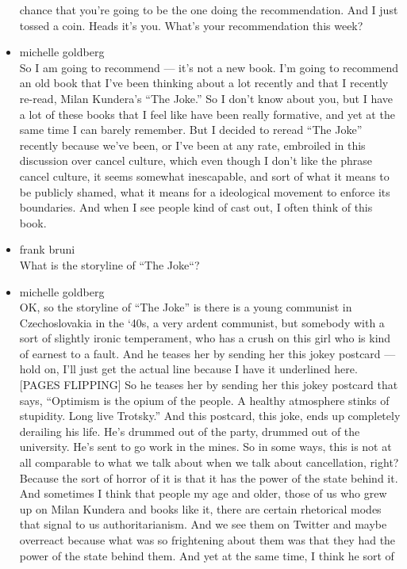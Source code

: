 \begin{itemize}
  chance that you're going to be the one doing the recommendation. And I
  just tossed a coin. Heads it's you. What's your recommendation this
  week?
\item
  michelle goldberg\\
  So I am going to recommend --- it's not a new book. I'm going to
  recommend an old book that I've been thinking about a lot recently and
  that I recently re-read, Milan Kundera's ``The Joke.'' So I don't know
  about you, but I have a lot of these books that I feel like have been
  really formative, and yet at the same time I can barely remember. But
  I decided to reread ``The Joke'' recently because we've been, or I've
  been at any rate, embroiled in this discussion over cancel culture,
  which even though I don't like the phrase cancel culture, it seems
  somewhat inescapable, and sort of what it means to be publicly shamed,
  what it means for a ideological movement to enforce its boundaries.
  And when I see people kind of cast out, I often think of this book.
\item
  frank bruni\\
  What is the storyline of ``The Joke``?
\item
  michelle goldberg\\
  OK, so the storyline of ``The Joke'' is there is a young communist in
  Czechoslovakia in the `40s, a very ardent communist, but somebody with
  a sort of slightly ironic temperament, who has a crush on this girl
  who is kind of earnest to a fault. And he teases her by sending her
  this jokey postcard --- hold on, I'll just get the actual line because
  I have it underlined here. {[}PAGES FLIPPING{]} So he teases her by
  sending her this jokey postcard that says, ``Optimism is the opium of
  the people. A healthy atmosphere stinks of stupidity. Long live
  Trotsky.'' And this postcard, this joke, ends up completely derailing
  his life. He's drummed out of the party, drummed out of the
  university. He's sent to go work in the mines. So in some ways, this
  is not at all comparable to what we talk about when we talk about
  cancellation, right? Because the sort of horror of it is that it has
  the power of the state behind it. And sometimes I think that people my
  age and older, those of us who grew up on Milan Kundera and books like
  it, there are certain rhetorical modes that signal to us
  authoritarianism. And we see them on Twitter and maybe overreact
  because what was so frightening about them was that they had the power
  of the state behind them. And yet at the same time, I think he sort of

\end{itemize}
